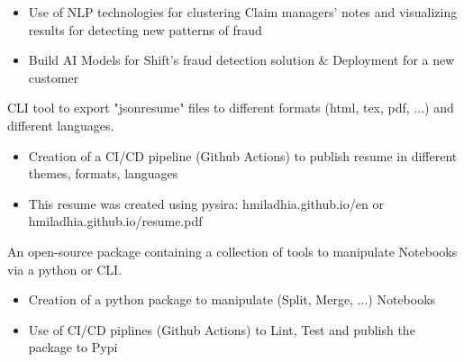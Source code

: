 \documentclass[10pt,letter,ragged2e,withhyper]{altacv}
\renewcommand{\divider}{\textcolor{body!30}{\hdashrule{\linewidth}{0.6pt}{0.5ex}}\medskip}
\begin{document}
\begin{paracol}{2}
\divider
{}

\begin{itemize}
  \item Use of NLP technologies for clustering Claim managers' notes and visualizing results for detecting new patterns of fraud
  \item Build AI Models for Shift's fraud detection solution \& Deployment for a new customer
\end{itemize}





CLI tool to export "jsonresume" files to different formats (html, tex, pdf, ...) and different languages.

\begin{itemize}
      \item Creation of a CI/CD pipeline (Github Actions) to publish resume in different themes, formats, languages
      \item This resume was created using pysira: hmiladhia.github.io/en or hmiladhia.github.io/resume.pdf
  \end{itemize}

\divider
{}

An open-source package containing a collection of tools to manipulate Notebooks via a python or CLI.

\begin{itemize}
      \item Creation of a python package to manipulate (Split, Merge, ...) Notebooks
      \item Use of CI/CD piplines (Github Actions) to Lint, Test and publish the package to Pypi
  \end{itemize}

\divider
{}


\end{paracol}
\end{document}
